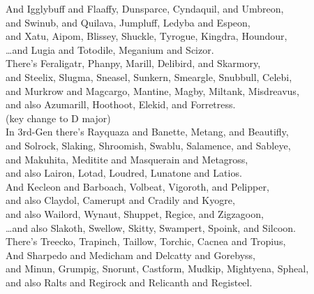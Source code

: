 \documentclass{amsart}
\begin{document}
And Igglybuff and Flaaffy, Dunsparce, Cyndaquil, and Umbreon,\\
and Swinub, and Quilava, Jumpluff, Ledyba and Espeon,\\
and Xatu, Aipom, Blissey, Shuckle, Tyrogue, Kingdra, Houndour,\\
\dots and Lugia and Totodile, Meganium and Scizor.\\

There's Feraligatr, Phanpy, Marill, Delibird, and Skarmory,\\
and Steelix, Slugma, Sneasel, Sunkern, Smeargle, Snubbull, Celebi,\\
and Murkrow and Magcargo, Mantine, Magby, Miltank, Misdreavus,\\
and also Azumarill, Hoothoot, Elekid, and Forretress.\\


(key change to D major)\\

In 3rd-Gen there's Rayquaza and Banette, Metang, and Beautifly,\\
and Solrock, Slaking, Shroomish, Swablu, Salamence, and Sableye,\\
and Makuhita, Meditite and Masquerain and Metagross,\\
and also Lairon, Lotad, Loudred, Lunatone and Latios.\\

And Kecleon and Barboach, Volbeat, Vigoroth, and Pelipper,\\
and also Claydol, Camerupt and Cradily and Kyogre,\\
and also Wailord, Wynaut, Shuppet, Regice, and Zigzagoon,\\
\dots and also Slakoth, Swellow, Skitty, Swampert, Spoink, and Silcoon.\\

There's Treecko, Trapinch, Taillow, Torchic, Cacnea and Tropius,\\
And Sharpedo and Medicham and Delcatty and Gorebyss,\\
and Minun, Grumpig, Snorunt, Castform, Mudkip, Mightyena, Spheal,\\
and also Ralts and Regirock and Relicanth and Registeel.\\
\end{document}
